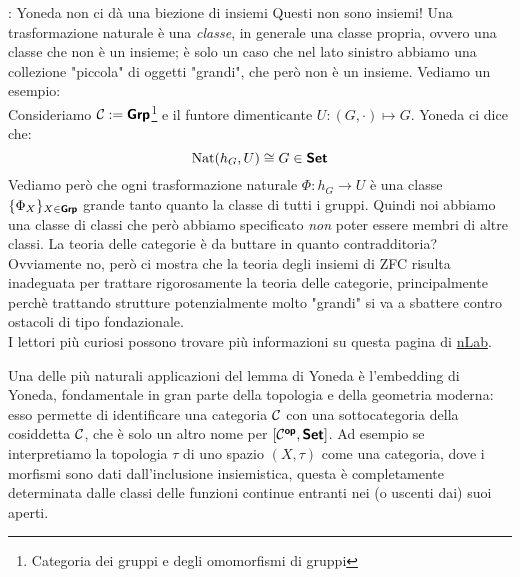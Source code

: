 \documentclass{article}
\renewcommand\C{\mc{C}}
\newcommand\nat{\operatorname{Nat}}
\begin{document}
\begin{remark}{\PHcat: Yoneda non ci dà una biezione di insiemi}{}
    Questi non sono insiemi! Una trasformazione naturale è una \textit{classe}, in generale una classe propria, ovvero una classe che non è un insieme; è solo un caso che nel lato sinistro abbiamo una collezione "piccola" di oggetti "grandi", che però non è un insieme. Vediamo un esempio:\\
    Consideriamo $\C := \grpcat$\footnote{Categoria dei gruppi e degli omomorfismi di gruppi} e il funtore dimenticante $U : (G, \cdot )\mapsto G$. Yoneda ci dice che:
    \[ \nat (h_G, U) \cong G \in \setcat \]
    Vediamo però che ogni trasformazione naturale $\Phi : h_G \to U$ è una classe $\{\Phi_X\}_{X\in\text{\sffamily\textbf{Grp}}}$ grande tanto quanto la classe di tutti i gruppi. Quindi noi abbiamo una classe di classi che però abbiamo specificato \textit{non} poter essere membri di altre classi. La teoria delle categorie è da buttare in quanto contradditoria?\\
    Ovviamente no, però ci mostra che la teoria degli insiemi di ZFC risulta inadeguata per trattare rigorosamente la teoria delle categorie, principalmente perchè trattando strutture potenzialmente molto "grandi" si va a sbattere contro ostacoli di tipo fondazionale.\\
    I lettori più curiosi possono trovare più informazioni su questa pagina di \href{https://ncatlab.org/nlab/show/category+theory+and+foundations}{nLab}.
\end{remark}

Una delle più naturali applicazioni del lemma di Yoneda è l'embedding di Yoneda, fondamentale in gran parte della topologia e della geometria moderna: esso permette di identificare una categoria $\C$ con una sottocategoria della cosiddetta  $\C$, che è solo un altro nome per $[\C^\op,\setcat]$. Ad esempio se interpretiamo la topologia $\tau$ di uno spazio $(X,\tau)$ come una categoria, dove i morfismi sono dati dall'inclusione insiemistica, questa è completamente determinata dalle classi delle funzioni continue entranti nei (o uscenti dai) suoi aperti.
\end{document}
